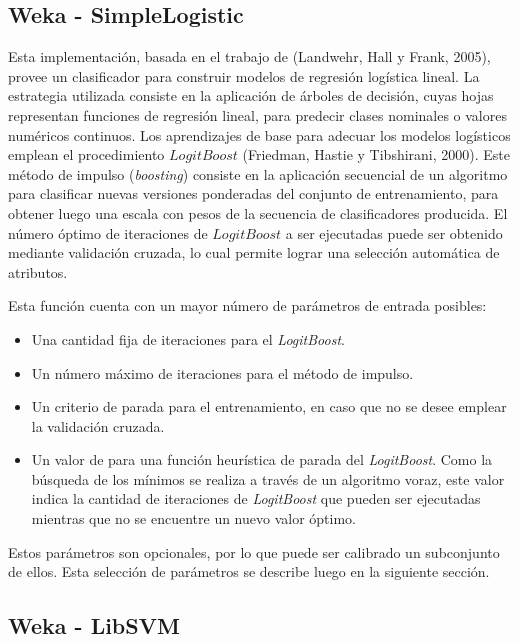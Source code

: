 \subsection{Weka - SimpleLogistic}

Esta implementaci\'on, basada en el trabajo de (Landwehr, Hall y Frank, 2005), provee un clasificador para construir modelos de regresi\'on log\'istica lineal. La estrategia utilizada consiste en la aplicaci\'on de \'arboles de decisi\'on, cuyas hojas representan funciones de regresi\'on lineal, para predecir clases nominales o valores num\'ericos continuos. Los aprendizajes de base para adecuar los modelos log\'isticos emplean el procedimiento $LogitBoost$ (Friedman, Hastie y Tibshirani, 2000). Este m\'etodo de impulso (\textit{boosting}) consiste en la aplicaci\'on secuencial de un algoritmo para clasificar nuevas versiones ponderadas del conjunto de entrenamiento, para obtener luego una escala con pesos de la secuencia de clasificadores producida. El n\'umero \'optimo de iteraciones de $LogitBoost$ a ser ejecutadas puede ser obtenido mediante validaci\'on cruzada, lo cual permite lograr una selecci\'on autom\'atica de atributos.
\newline

Esta funci\'on cuenta con un mayor n\'umero de par\'ametros de entrada posibles:
\begin{itemize}
\item Una cantidad fija de iteraciones para el \textit{LogitBoost}.
\item Un n\'umero m\'aximo de iteraciones para el m\'etodo de impulso.
\item Un criterio de parada para el entrenamiento, en caso que no se desee emplear la validaci\'on cruzada.
\item Un valor de para una funci\'on heur\'istica de parada del \textit{LogitBoost}. Como la b\'usqueda de los m\'inimos se realiza a trav\'es de un algoritmo voraz, este valor indica la cantidad de iteraciones de \textit{LogitBoost} que pueden ser ejecutadas mientras que no se encuentre un nuevo valor \'optimo.
\end{itemize}

Estos par\'ametros son opcionales, por lo que puede ser calibrado un subconjunto de ellos. Esta selecci\'on de par\'ametros se describe luego en la siguiente secci\'on.

\subsection{Weka - LibSVM}

